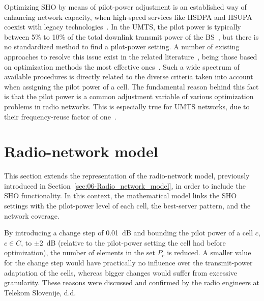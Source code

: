 Optimizing SHO by means of pilot-power adjustment is an established
way of enhancing network capacity, when high-speed services like HSDPA
and HSUPA coexist with legacy technologies~\cite{chen2008cpich}.
In the UMTS, the pilot power is typically between 5\% to 10\% of the
total downlink transmit power of the BS~\cite{RadioNetworkPlanningAndOptimisationForUMTS},
but there is no standardized method to fi{}nd a pilot-power setting.
A number of existing approaches to resolve this issue exist in the
related literature~\cite{WCDMAforUMTS_RadioAccessForThirdGenerationMobileCommunications,Siomina_PilotPowerManagementInWCDMANetworksCoverageControlWithRespectToTrafficDistribution,Ying_CPICHPowerSettingsInIrregularWCDMAMacroCellularNetworks},
being those based on optimization methods the most eff{}ective ones~\cite{Eisenblatter_OptimizationMethodsForUMTSRadioNetworkPlanning,GarciaLozano_CPICHPowerOptimisationByMeansOfSimulatedAnnealingInAnUTRAFDDEnvironment,RadioNetworkPlanningAndOptimisationForUMTS,UMTSRadioNetworkPlanning_OptimizationAndQoSManagementForPracticalEngineeringTasks,siomina2008minimum}.
Such a wide spectrum of available procedures is directly related to
the diverse criteria taken into account when assigning the pilot power
of a cell. The fundamental reason behind this fact is that the pilot
power is a common adjustment variable of various optimization problems
in radio networks. This is especially true for UMTS networks, due
to their frequency-reuse factor of one~\cite{WCDMAforUMTS_RadioAccessForThirdGenerationMobileCommunications}.


\section{Radio-network model \label{sec:07-Radio_network_model}}

This section extends the representation of the radio-network model,
previously introduced in Section~\ref{sec:06-Radio_network_model},
in order to include the SHO functionality. In this context, the mathematical
model links the SHO settings with the pilot-power level of each cell,
the best-server pattern, and the network coverage.

By introducing a change step of 0.01~dB and bounding the pilot power
of a cell $c$, $c\in C$, to $\pm2$~dB (relative to the pilot-power
setting the cell had before optimization), the number of elements
in the set $P_{c}$ is reduced. A smaller value for the change step
would have practically no influence over the transmit-power adaptation
of the cells, whereas bigger changes would suffer from excessive granularity.
These reasons were discussed and confirmed by the radio engineers
at Telekom Slovenije, d.d.

